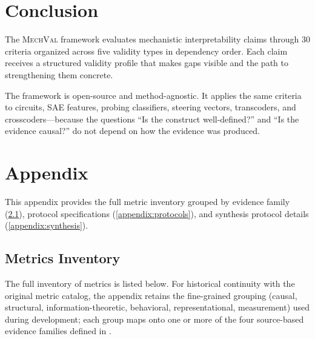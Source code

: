 \documentclass{article}
\newcommand{\mechval}{\textsc{MechVal}}
\begin{document}
\section{Conclusion}
\label{sec:conclusion}

The \mechval{} framework evaluates mechanistic interpretability claims through 30 criteria organized across five validity types in dependency order. Each claim receives a structured validity profile that makes gaps visible and the path to strengthening them concrete.

The framework is open-source and method-agnostic. It applies the same criteria to circuits, SAE features, probing classifiers, steering vectors, transcoders, and crosscoders---because the questions ``Is the construct well-defined?'' and ``Is the evidence causal?'' do not depend on how the evidence was produced.

%
%



\nocite{campbell1963experimental,loevinger1957objective}



\clearpage
\appendix
\section{Appendix}

This appendix provides the full metric inventory grouped by evidence family (\ref{appendix:metrics}), protocol specifications (\ref{appendix:protocols}), and synthesis protocol details (\ref{appendix:synthesis}).

\subsection{Metrics Inventory}
\label{appendix:metrics}
The full inventory of metrics is listed below. For historical continuity with the original metric catalog, the appendix retains the fine-grained grouping (causal, structural, information-theoretic, behavioral, representational, measurement) used during development; each group maps onto one or more of the four source-based evidence families defined in . \\
\\
\begingroup
\small
\setlength{\tabcolsep}{4pt}
\renewcommand{\arraystretch}{1.15}
\end{document}
